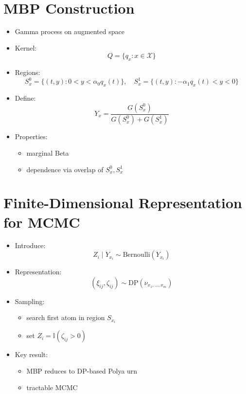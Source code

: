 \documentclass[12pt,oneside]{book}
\numberwithin{equation}{section}
\theoremstyle{definition}
\theoremstyle{plain}
\theoremstyle{remark}
\begin{document}
\section{MBP Construction}

\begin{itemize}
\item Gamma process on augmented space

\item Kernel:
\[
Q = \{q_x : x \in \mathcal{X}\}
\]

\item Regions:
\[
S_x^0 = \{(t,y): 0 < y < \alpha_0 q_x(t)\}, \quad
S_x^1 = \{(t,y): -\alpha_1 q_x(t) < y < 0\}
\]

\item Define:
\[
Y_x = \frac{G(S_x^0)}{G(S_x^0) + G(S_x^1)}
\]

\item Properties:
\begin{itemize}
\item marginal Beta
\item dependence via overlap of $S_x^0, S_x^1$
\end{itemize}
\end{itemize}

\section{Finite-Dimensional Representation for MCMC}

\begin{itemize}
\item Introduce:
\[
Z_i \mid Y_{x_i} \sim \text{Bernoulli}(Y_{x_i})
\]

\item Representation:
\[
(\xi_{ij}, \zeta_{ij}) \sim \text{DP}(\nu_{x_1,\dots,x_m})
\]

\item Sampling:
\begin{itemize}
\item search first atom in region $S_{x_i}$
\item set $Z_i = \mathbb{I}(\zeta_{ij} > 0)$
\end{itemize}

\item Key result:
\begin{itemize}
\item MBP reduces to DP-based Polya urn
\item tractable MCMC
\end{itemize}
\end{itemize}
\end{document}
